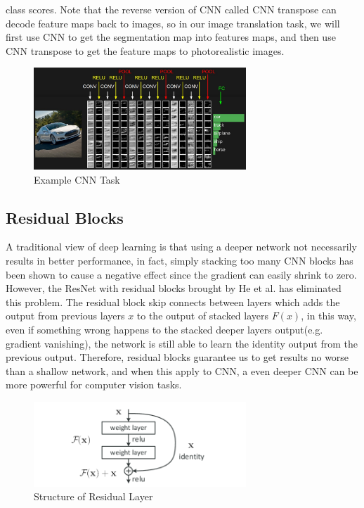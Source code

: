 class scores. Note that the reverse version of CNN called CNN transpose can decode feature maps back to images,
so in our image translation task, we will first use CNN to get the segmentation map into features maps, and then
use CNN transpose to get the feature maps to photorealistic images.
\begin{figure}[H]
    \begin{center}
    \includegraphics[width=8cm]{figures/convnet}
    \end{center}
    \caption{Example CNN Task}
    \label{fig:CNN}
\end{figure}

\subsection{Residual Blocks}
A traditional view of deep learning is that using a deeper network not necessarily results in better 
performance, in fact, simply stacking too many CNN blocks has been shown to cause a negative effect
since the gradient can easily shrink to zero. However, the ResNet with residual blocks brought by He et al. 
\cite{he2015deep} has eliminated this problem. The residual block skip connects between layers which adds
the output from previous layers $x$ to the output of stacked layers $F(x)$, in this way, even if something wrong
happens to the stacked deeper layers output(e.g. gradient vanishing), the network is still able to learn the 
identity output from the previous output. Therefore, residual blocks guarantee us to get results no worse than
a shallow network, and when this apply to CNN, a even deeper CNN can be more powerful for computer vision tasks.
\begin{figure}[H]
    \begin{center}
    \includegraphics[width=8cm]{figures/resnet}
    \end{center}
    \caption{Structure of Residual Layer}
    \label{fig:Res-structure}
\end{figure}

